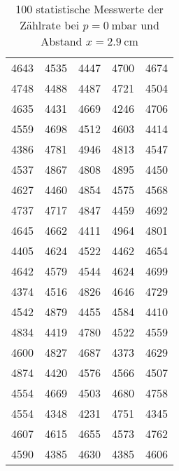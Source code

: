     \begin{table}
      \centering
      \caption{100 statistische Messwerte der Zählrate bei $p = \SI{0}{\milli\bar}$ und Abstand 
          $x = \SI{2.9}{\centi\meter}$}
      \label{tab:mess3}
      \begin{tabular}{c c c c c}
      \toprule
          4643 & 4535 & 4447 & 4700 & 4674 \\
          4748 & 4488 & 4487 & 4721 & 4504 \\
          4635 & 4431 & 4669 & 4246 & 4706 \\
          4559 & 4698 & 4512 & 4603 & 4414 \\
          4386 & 4781 & 4946 & 4813 & 4547 \\
          4537 & 4867 & 4808 & 4895 & 4450 \\
          4627 & 4460 & 4854 & 4575 & 4568 \\
          4737 & 4717 & 4847 & 4459 & 4692 \\
          4645 & 4662 & 4411 & 4964 & 4801 \\
          4405 & 4624 & 4522 & 4462 & 4654 \\
          4642 & 4579 & 4544 & 4624 & 4699 \\
          4374 & 4516 & 4826 & 4646 & 4729 \\
          4542 & 4879 & 4455 & 4584 & 4410 \\
          4834 & 4419 & 4780 & 4522 & 4559 \\
          4600 & 4827 & 4687 & 4373 & 4629 \\
          4874 & 4420 & 4576 & 4566 & 4507 \\
          4554 & 4669 & 4503 & 4680 & 4758 \\
          4554 & 4348 & 4231 & 4751 & 4345 \\
          4607 & 4615 & 4655 & 4573 & 4762 \\
          4590 & 4385 & 4630 & 4385 & 4606 \\
      \bottomrule
      \end{tabular}
      \end{table}


